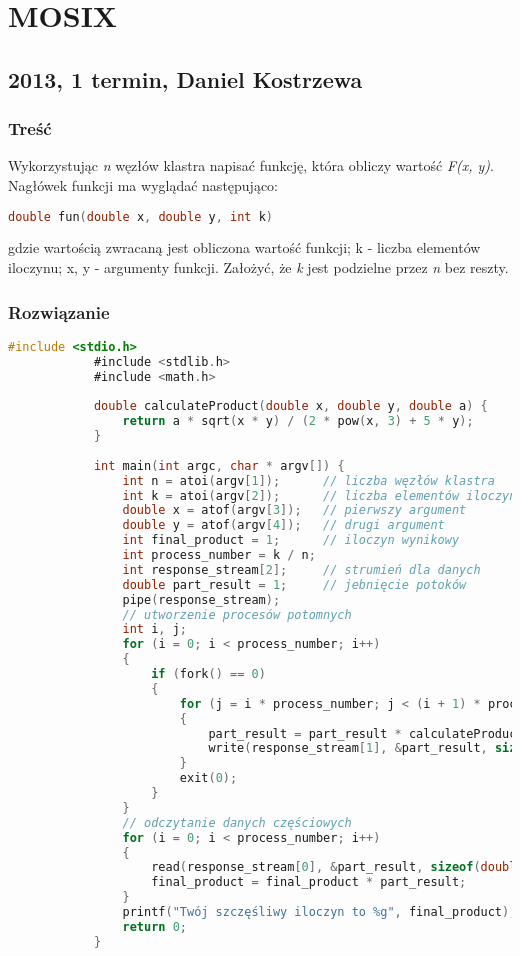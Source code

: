 \newpage
\section{MOSIX}
	\subsection{2013, 1 termin, Daniel Kostrzewa}
		\subsubsection{Treść}
		Wykorzystując \textit{n} węzłów klastra napisać funkcję, która obliczy wartość \textit{F(x, y)}. Nagłówek funkcji ma wyglądać następująco:
		\begin{lstlisting}[language=C]
			double fun(double x, double y, int k)
		\end{lstlisting}
		gdzie wartością zwracaną jest obliczona wartość funkcji; k - liczba elementów iloczynu; x, y - argumenty funkcji. Założyć, że \textit{k} jest podzielne przez \textit{n} bez reszty.
	\subsubsection{Rozwiązanie}
		\begin{lstlisting}[language=C]
			#include <stdio.h>
			#include <stdlib.h>
			#include <math.h>
			
			double calculateProduct(double x, double y, double a) {
				return a * sqrt(x * y) / (2 * pow(x, 3) + 5 * y);
			}
			
			int main(int argc, char * argv[]) {
				int n = atoi(argv[1]);		// liczba węzłów klastra
				int k = atoi(argv[2]);		// liczba elementów iloczynu
				double x = atof(argv[3]);	// pierwszy argument
				double y = atof(argv[4]);	// drugi argument
				int final_product = 1;		// iloczyn wynikowy
				int process_number = k / n;
				int response_stream[2];		// strumień dla danych
				double part_result = 1;		// jebnięcie potoków
				pipe(response_stream);
				// utworzenie procesów potomnych
				int i, j;
				for (i = 0; i < process_number; i++)
				{
					if (fork() == 0)
					{
						for (j = i * process_number; j < (i + 1) * process_number; j++)
						{
							part_result = part_result * calculateProduct(x, y, j);
							write(response_stream[1], &part_result, sizeof(double));
						}
						exit(0);
					}
				}
				// odczytanie danych częściowych
				for (i = 0; i < process_number; i++)
				{
					read(response_stream[0], &part_result, sizeof(double));
					final_product = final_product * part_result;
				}
				printf("Twój szczęśliwy iloczyn to %g", final_product);
				return 0;
			}
		\end{lstlisting}

